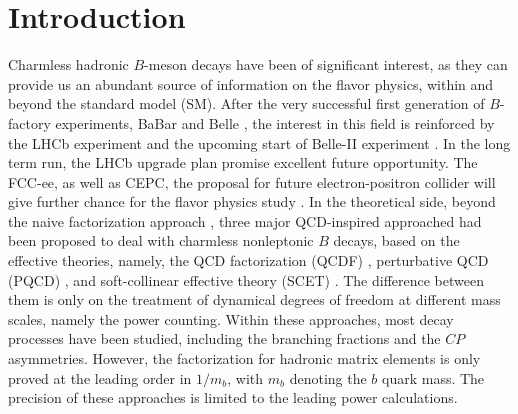 \documentclass[11pt]{article}
\begin{document}
\section{Introduction}\label{sec-1}

Charmless hadronic $B$-meson decays have been of significant interest, as they can provide us an abundant source of information on the flavor physics, within and beyond the standard model (SM). After the very successful first generation of $B$-factory experiments, BaBar and Belle \cite{Bevan:2014iga}, the interest in this field is reinforced by the LHCb experiment \cite{Buchalla:2008jp} and the upcoming start of Belle-II experiment \cite{Aushev:2010bq,Browder:2007gg}. In the long term run, the LHCb upgrade plan promise excellent future opportunity\cite{Gianotti:2002xx,LHCb:2011dta}. The FCC-ee, as well as CEPC, the proposal for future electron-positron collider will give further chance for the flavor physics study \cite{cepc}.
In the theoretical side, beyond the naive factorization approach \cite{Wirbel:1985ji}, three major QCD-inspired approached had been proposed to deal with charmless nonleptonic $B$ decays, based on the effective theories,  namely,  the QCD factorization (QCDF) \cite{Beneke:2000ry}, perturbative QCD (PQCD) \cite{Lu:2000em}, and soft-collinear effective theory (SCET) \cite{Bauer:2000yr}.   The difference between them  is only on the treatment of dynamical degrees of freedom at different mass scales, namely the power counting. Within these approaches, most decay processes have been studied, including the branching fractions and the $CP$ asymmetries. However,
the factorization for hadronic matrix elements   is only proved at the leading order in $1/m_b$, with   $m_b$ denoting     the $b$ quark mass.
The precision of these approaches is limited to the leading power calculations.
\end{document}
